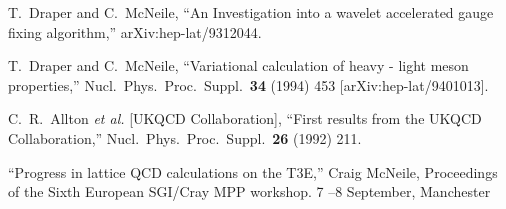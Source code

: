 \begin{thebibliography}{130}
T.~Draper and C.~McNeile,
``An Investigation into a wavelet accelerated gauge fixing algorithm,''
arXiv:hep-lat/9312044.

T.~Draper and C.~McNeile,
``Variational calculation of heavy - light meson properties,''
Nucl.\ Phys.\ Proc.\ Suppl.\  {\bf 34} (1994) 453
[arXiv:hep-lat/9401013].

C.~R.~Allton {\it et al.}  [UKQCD Collaboration],
``First results from the UKQCD Collaboration,''
Nucl.\ Phys.\ Proc.\ Suppl.\  {\bf 26} (1992) 211.


``Progress in lattice QCD calculations on the T3E,'' Craig McNeile,
Proceedings of the
   Sixth European SGI/Cray MPP workshop. 7 --8 September, Manchester



\end{thebibliography}

